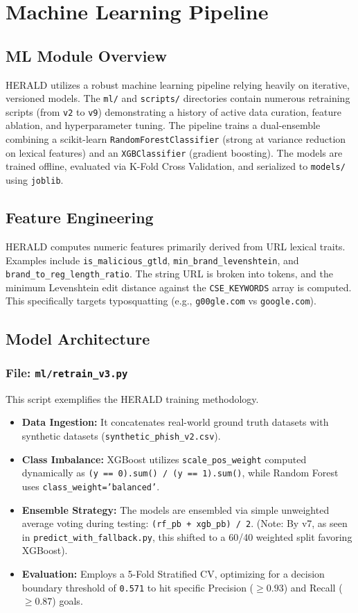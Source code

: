\documentclass[12pt,a4paper]{report}
\begin{document}
\chapter{Machine Learning Pipeline}
\section{ML Module Overview}
HERALD utilizes a robust machine learning pipeline relying heavily on iterative, versioned models. The \texttt{ml/} and \texttt{scripts/} directories contain numerous retraining scripts (from \texttt{v2} to \texttt{v9}) demonstrating a history of active data curation, feature ablation, and hyperparameter tuning. The pipeline trains a dual-ensemble combining a scikit-learn \texttt{RandomForestClassifier} (strong at variance reduction on lexical features) and an \texttt{XGBClassifier} (gradient boosting). The models are trained offline, evaluated via K-Fold Cross Validation, and serialized to \texttt{models/} using \texttt{joblib}.

\section{Feature Engineering}
HERALD computes numeric features primarily derived from URL lexical traits. Examples include \texttt{is\_malicious\_gtld}, \texttt{min\_brand\_levenshtein}, and \texttt{brand\_to\_reg\_length\_ratio}. The string URL is broken into tokens, and the minimum Levenshtein edit distance against the \texttt{CSE\_KEYWORDS} array is computed. This specifically targets typosquatting (e.g., \texttt{g00gle.com} vs \texttt{google.com}).

\section{Model Architecture}
\subsection{File: \texttt{ml/retrain\_v3.py}}
This script exemplifies the HERALD training methodology.
\begin{itemize}
\item \textbf{Data Ingestion:} It concatenates real-world ground truth datasets with synthetic datasets (\texttt{synthetic\_phish\_v2.csv}).
\item \textbf{Class Imbalance:} XGBoost utilizes \texttt{scale\_pos\_weight} computed dynamically as \texttt{(y == 0).sum() / (y == 1).sum()}, while Random Forest uses \texttt{class\_weight='balanced'}.
\item \textbf{Ensemble Strategy:} The models are ensembled via simple unweighted average voting during testing: \texttt{(rf\_pb + xgb\_pb) / 2}. (Note: By v7, as seen in \texttt{predict\_with\_fallback.py}, this shifted to a 60/40 weighted split favoring XGBoost).
\item \textbf{Evaluation:} Employs a 5-Fold Stratified CV, optimizing for a decision boundary threshold of \texttt{0.571} to hit specific Precision ($\ge 0.93$) and Recall ($\ge 0.87$) goals.
\end{itemize}
\end{document}
